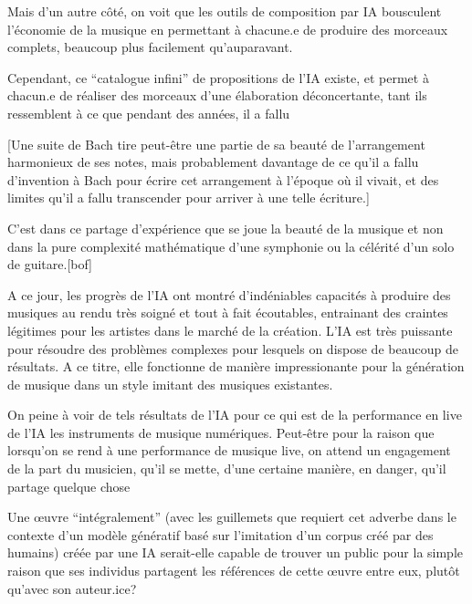Mais d'un autre côté, on voit que les outils de composition par IA bousculent l'économie de la musique en permettant à chacune.e de produire des morceaux complets, beaucoup plus facilement qu'auparavant.

Cependant, ce ``catalogue infini'' de propositions de l'IA existe, et permet à chacun.e de réaliser des morceaux d'une élaboration déconcertante, tant ils ressemblent à ce que pendant des années, il a fallu 

[Une suite de Bach tire peut-être une partie de sa beauté de l'arrangement harmonieux de ses notes, mais probablement davantage de ce qu'il a fallu d'invention à Bach pour écrire cet arrangement à l'époque où il vivait, et des limites qu'il a fallu transcender pour arriver à une telle écriture.]

C'est dans ce partage d'expérience que se joue la beauté de la musique et non dans la pure complexité mathématique d'une symphonie ou la célérité d'un solo de guitare.[bof]

A ce jour, les progrès de l'IA ont montré d'indéniables capacités à produire des musiques au rendu très soigné et tout à fait écoutables, entrainant des craintes légitimes pour les artistes dans le marché de la création. 
L'IA est très puissante pour résoudre des problèmes complexes pour lesquels on dispose de beaucoup de résultats. A ce titre, elle fonctionne de manière impressionante pour la génération de musique dans un style imitant des musiques existantes.

On peine à voir de tels résultats de l'IA pour ce qui est de la performance en live de l'IA les instruments de musique numériques.
Peut-être pour la raison que lorsqu'on se rend à une performance de musique live, on attend un engagement de la part du musicien, qu'il se mette, d'une certaine manière, en danger, qu'il partage quelque chose



Une œuvre ``intégralement'' (avec les guillemets que requiert cet adverbe dans le contexte d'un modèle génératif basé sur l'imitation d'un corpus créé par des humains) créée par une IA serait-elle capable de trouver un public pour la simple raison que ses individus partagent les références de cette œuvre entre eux, plutôt qu'avec son auteur.ice?


